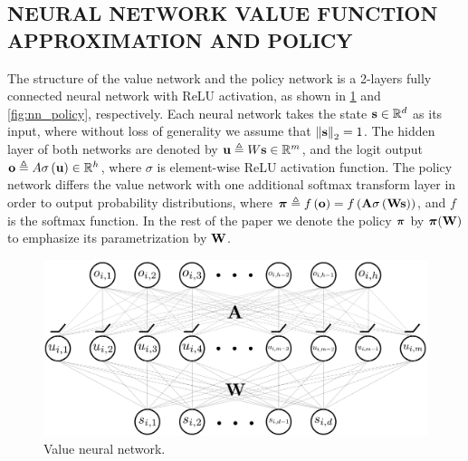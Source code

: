 \subsection{NEURAL NETWORK VALUE FUNCTION APPROXIMATION AND POLICY}
\label{subsec:nn_value_policy}
The structure of the value network and the policy network  is a 2-layers fully connected neural network with ReLU activation, as shown in \cref{fig:nn_value} and \cref{fig:nn_policy}, respectively. 
Each neural network takes the state ${\mathbf{s}} \in {\mathbb{R}}^d$ as its input, where without loss of generality we assume that $\left\| {\mathbf{s}} \right\|_2 = 1$.
The hidden layer of both networks are denoted by ${\mathbf{u}}   \triangleq W{\mathbf{s}}\in{\mathbb{R}}^m$, and the logit output ${\mathbf{o}} \triangleq A\sigma\left( {\mathbf{u}}\right) \in {\mathbb{R}}^h$, where $\sigma$ is element-wise ReLU activation function. 
The policy network differs the value network with one additional softmax transform layer in order to output probability distributions, where ${\boldsymbol{\pi}} \triangleq f\left( {\mathbf{o}} \right) = f\left( {\mathbf{A}} \sigma\left( {\mathbf{W}} {\mathbf{s}} \right) \right)$, and $f$ is the softmax function. In the rest of the paper we denote the policy ${\boldsymbol{\pi}}$ by ${\boldsymbol{\pi}}({\mathbf{W}})$ to emphasize its parametrization by ${\mathbf{W}}$. 


\begin{figure}[t]
	\vskip 0.2in
	\begin{center}
		\centerline{\includegraphics[width=\columnwidth]{nn_value.pdf}}
		\caption{Value neural network.}
		\label{fig:nn_value}
	\end{center}
	\vskip -0.2in
\end{figure}

